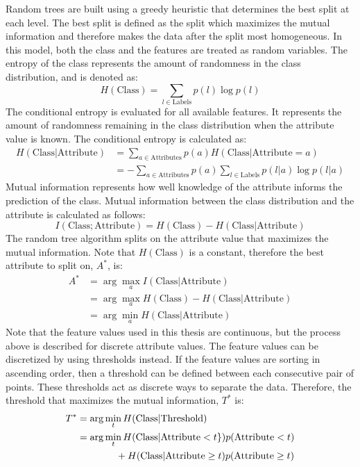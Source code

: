 \documentclass[12pt]{report}
\begin{document}
Random trees are built using a greedy heuristic that determines the best split at each level.
The best split is defined as the split which maximizes the mutual information and therefore makes the data after the split most homogeneous.
In this model, both the class and the features are treated as random variables.
The entropy of the class represents the amount of randomness in the class distribution, and is denoted as:
\begin{equation}
H(\text{Class})=\sum_{l\in \text{Labels}} p(l)\log p(l)
\end{equation}
The conditional entropy is evaluated for all available features.  
It represents the amount of randomness remaining in the class distribution when the attribute value is known.
The conditional entropy is calculated as:
\begin{align}
H(\text{Class}|\text{Attribute}) &= \sum_{a\in \text{Attributes}}p(a)H(\text{Class}|\text{Attribute}=a) \\
&=  -\sum_{a\in\text{Attributes}}p(a)\sum_{l\in\text{Labels}}p(l|a)\log p(l|a)
\end{align}
Mutual information represents how well knowledge of the attribute informs the prediction of the class.
Mutual information between the class distribution and the attribute is calculated as follows:
\begin{equation}
I(\text{Class}; \text{Attribute}) = H(\text{Class}) - H(\text{Class} | \text{Attribute})
\end{equation} \label{eq:info_gained}
The random tree algorithm splits on the attribute value that maximizes the mutual information.
Note that $H(\text{Class})$ is a constant, therefore the best attribute to split on, $A^*$, is:
\begin{align}
A^* &= \arg\max_a I(\text{Class}|\text{Attribute}) \\
&= \arg \max_a H(\text{Class})-H(\text{Class}|\text{Attribute})\\
&= \arg\min_a H(\text{Class}|\text{Attribute})
\end{align}
Note that the feature values used in this thesis are continuous, but the process above is described for discrete attribute values.
The feature values can be discretized by using thresholds instead.
If the feature values are sorting in ascending order, then a threshold can be defined between each consecutive pair of points.
These thresholds act as discrete ways to separate the data.
Therefore, the threshold that maximizes the mutual information, $T^*$ is:
\begin{align}
T^* &= \arg\min_t H(\text{Class}|\text{Threshold})\\
&= \arg\min_t H(\text{Class}|\text{Attribute}<t\})p(\text{Attribute}<t) \notag \\
 &\qquad \qquad + H(\text{Class}|\text{Attribute}\geq t)p(\text{Attribute}\geq t)
\end{align}
\end{document}
